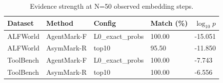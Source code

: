 \begin{table}[t]
\centering
\small
\caption{Evidence strength at N=50 observed embedding steps.}
\label{tab:evidence-n50-0510}
\begin{tabular}{lllll}
\toprule
Dataset & Method & Config & Match (\%) & $\log_{10} p$ \\
\midrule
ALFWorld & AgentMark-F & L0\_exact\_probs & 100.00 & -15.051 \\
ALFWorld & AsymMark-R & top10 & 95.50 & -11.850 \\
ToolBench & AgentMark-F & L0\_exact\_probs & 100.00 & -7.743 \\
ToolBench & AsymMark-R & top10 & 100.00 & -6.556 \\
\bottomrule
\end{tabular}
\end{table}
